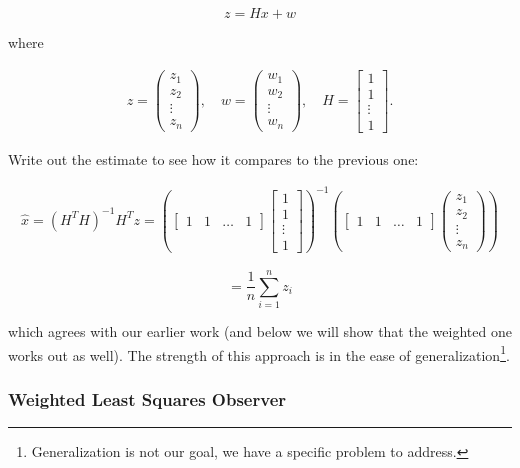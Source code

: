 \[z = Hx + w\]

where

\[\begin{aligned}
z = \begin{pmatrix} z_1 \\ z_2 \\ \vdots \\ z_n \end{pmatrix}, \quad  w = \begin{pmatrix} w_1 \\ w_2 \\ \vdots \\ w_n \end{pmatrix},\quad
H = \begin{bmatrix} 1 \\ 1 \\ \vdots \\ 1 \end{bmatrix}.
\end{aligned}\]

Write out the estimate to see how it compares to the previous one:

\[\begin{aligned}
\hat{x} = \left(H^TH\right)^{-1} H^T z = \left(\begin{bmatrix} 1 & 1 & \dots & 1\end{bmatrix} \begin{bmatrix} 1 \\ 1 \\ \vdots \\ 1 \end{bmatrix}\right)^{-1} \left( \begin{bmatrix} 1 & 1 & \dots & 1\end{bmatrix} \begin{pmatrix} z_1 \\ z_2 \\ \vdots \\ z_n \end{pmatrix}\right)
\end{aligned}\]

\[= \frac{1}{n} \sum_{i=1}^{n} z_i\]

which agrees with our earlier work (and below we will show that the
weighted one works out as well). The strength of this approach is in the
ease of generalization\footnote{Generalization is not our goal, we have
  a specific problem to address.}.

\hypertarget{weighted-least-squares-observer}{%
\subsubsection{Weighted Least Squares
Observer}\label{weighted-least-squares-observer}}

